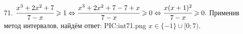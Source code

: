 71. $\cfrac{x^3+2x^2+7}{7-x}\geqslant1\Leftrightarrow\cfrac{x^3+2x^2+7-7+x}{7-x}\geqslant0\Leftrightarrow
\cfrac{x(x+1)^2}{7-x}\geqslant0.$ Применив метод интервалов, найдём ответ:
{{PIC:int71.png}}
$x\in\{-1\}\cup[0;7).$\\
